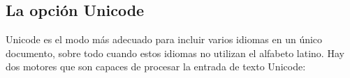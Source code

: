 




\subsection{La opción Unicode}

Unicode es el modo más adecuado para incluir varios idiomas en un único 
documento, sobre todo cuando estos idiomas no utilizan el alfabeto latino. 
Hay dos motores  que son capaces de procesar la entrada de texto 
Unicode:

